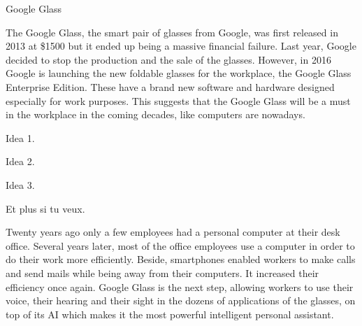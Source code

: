 \documentclass[a4paper,12pt]{article}
\begin{document}
\begin{center}
\huge
Google Glass
\end{center}

The Google Glass, the smart pair of glasses from Google, was first released in 2013 at \$1500 but it ended up being a massive financial failure. Last year, Google decided to stop the production and the sale of the glasses. However, in 2016 Google is launching the new foldable glasses for the workplace, the Google Glass Enterprise Edition. These have a brand new software and hardware designed especially for work purposes. This suggests that the Google Glass will be a must in the workplace in the coming decades, like computers are nowadays.

Idea 1.

Idea 2.

Idea 3.

Et plus si tu veux.

Twenty years ago only a few employees had a personal computer at their desk office. Several years later, most of the office employees use a computer in order to do their work more efficiently. Beside, smartphones enabled workers to make calls and send mails while being away from their computers. It increased their efficiency once again. Google Glass is the next step, allowing workers to use their voice, their hearing and their sight in the dozens of applications of the glasses, on top of its AI which makes it the most powerful intelligent personal assistant.
\end{document}
